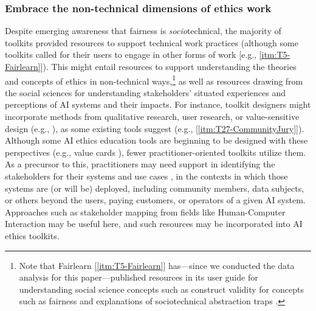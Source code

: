 \documentclass[acmsmall]{acmart}
\begin{document}
\subsubsection{Embrace the non-technical dimensions of ethics work}
Despite emerging awareness that fairness is \textit{socio}technical, the majority of toolkits provided resources to support technical work practices (although some toolkits called for their users to engage in other forms of work [e.g., \ref{itm:T5-Fairlearn}]). This might entail resources to support understanding the theories and concepts of ethics in non-technical ways,\footnote{Note that Fairlearn [\ref{itm:T5-Fairlearn}] has---since we conducted the data analysis for this paper---published resources in its user guide for understanding social science concepts such as construct validity for concepts such as fairness \cite{jacobs2021measurement} and explanations of sociotechnical abstraction traps \cite{selbst2019fairness}.} as well as resources drawing from the social sciences for understanding stakeholders' situated experiences and perceptions of AI systems and their impacts. %
For instance, toolkit designers might incorporate methods from qualitative research, user research, or value-sensitive design (e.g., \cite{friedman2002value}), as some existing tools suggest (e.g., [\ref{itm:T27-CommunityJury}]). Although some AI ethics education tools are beginning to be designed with these perspectives (e.g., value cards \cite{shen2021valuecards}), fewer practitioner-oriented toolkits utilize them. As a precursor to this, practitioners may need support in identifying the stakeholders for their systems and use cases \cite[cf.][]{madaio2022assessing}, in the contexts in which those systems are (or will be) deployed, including community members, data subjects, or others beyond the users, paying customers, or operators of a given AI system. Approaches such as stakeholder mapping from fields like Human-Computer Interaction \cite[e.g.,][]{yoo2018stakeholder} may be useful here, and such resources may be incorporated into AI ethics toolkits.
\end{document}
